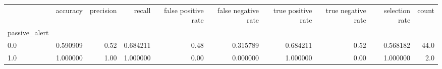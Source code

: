 \begin{tabular}{lrrrrrrrrr}
\toprule
{} &  accuracy &  precision &    recall &  false positive rate &  false negative rate &  true positive rate &  true negative rate &  selection rate &  count \\
passive\_alert &           &            &           &                      &                      &                     &                     &                 &        \\
\midrule
0.0           &  0.590909 &       0.52 &  0.684211 &                 0.48 &             0.315789 &            0.684211 &                0.52 &        0.568182 &   44.0 \\
1.0           &  1.000000 &       1.00 &  1.000000 &                 0.00 &             0.000000 &            1.000000 &                0.00 &        1.000000 &    2.0 \\
\bottomrule
\end{tabular}
